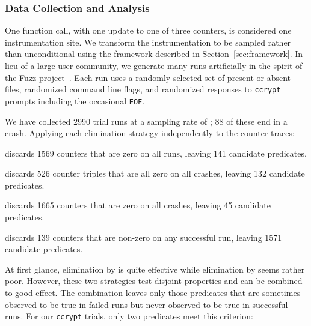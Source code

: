 \subsubsection{Data Collection and Analysis}

One function call, with one update to one of three counters, is considered one
instrumentation site.  We transform the instrumentation to be sampled
rather than unconditional using the framework described in
Section~\ref{sec:framework}.  In lieu of a large user community, we
generate many runs artificially in the spirit of the Fuzz
project~\cite{MKLMMNS95}.  Each run uses a randomly selected set of
present or absent files, randomized command line flags, and randomized
responses to \texttt{ccrypt} prompts including the occasional
\texttt{EOF}.

We have collected 2990 trial runs at a sampling rate of
; 88 of these end in a crash.  Applying each
elimination strategy independently to the counter traces:

\begin{elimlist}
\item[\elim{Universal falsehood}] discards 1569 counters that are
  zero on all runs, leaving 141 candidate predicates.
  
\item[\elim{Lack of failing coverage}] discards 526 counter triples
  that are all zero on all crashes, leaving 132 candidate predicates.
  
\item[\elim{Lack of failing example}] discards 1665 counters that are
  zero on all crashes, leaving 45 candidate predicates.
  
\item[\elim{Successful counterexample}] discards 139 counters that
  are non-zero on any successful run, leaving 1571 candidate
  predicates.
\end{elimlist}

\begin{sloppypar}
  At first glance, elimination by  is quite
  effective while elimination by 
  seems rather poor.  However, these two strategies test disjoint
  properties and can be combined to good effect.  The combination
  leaves only those predicates that are sometimes observed to be true
  in failed runs but never observed to be true in successful runs.
  For our \texttt{ccrypt} trials, only two predicates meet this
  criterion:
\end{sloppypar}

